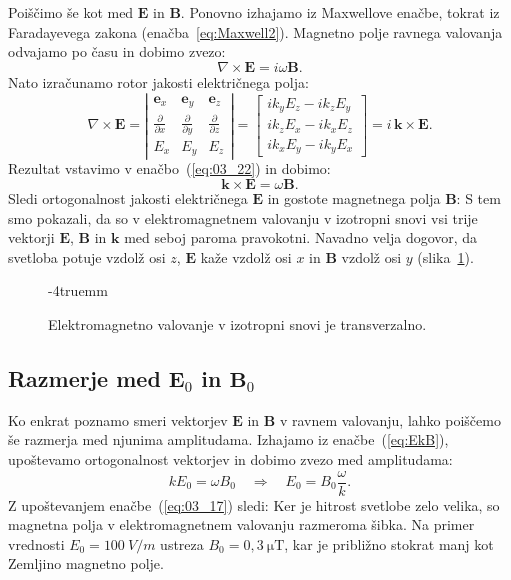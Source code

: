 Poiščimo še kot med $\mathbf{E}$ in $\mathbf{B}$. Ponovno izhajamo iz Maxwellove 
enačbe, tokrat iz Faradayevega zakona (enačba~\ref{eq:Maxwell2}). Magnetno polje ravnega valovanja 
odvajamo po času in dobimo zvezo:
\begin{equation}
\nabla\times\mathbf{E} = i \omega \mathbf{B}.
\label{eq:03_22}
\end{equation}
Nato izračunamo rotor jakosti električnega polja:
\begin{equation}
\nabla \times \mathbf{E} = 
\left|
\begin{array}{ccc}
\mathbf{e}_x & \mathbf{e}_y & \mathbf{e}_z\\
\frac{\partial}{\partial x} & \frac{\partial}{\partial y} & \frac{\partial}{\partial z}\\
E_{x} & E_{y} & E_{z}
\end{array}\right|
= 
\left[
\begin{array}{c}
ik_y E_z-ik_zE_y\\
ik_z E_x-ik_xE_z\\
ik_x E_y-ik_yE_x
\end{array}\right] = 
i\, \mathbf{k}\times \mathbf{E}.
\label{eq:03_23}
\end{equation}
Rezultat vstavimo v enačbo~(\ref{eq:03_22}) in dobimo:
\begin{equation}
\mathbf{k}\times \mathbf{E} = \omega \mathbf{B}.
\label{eq:EkB}
\end{equation}
Sledi ortogonalnost jakosti električnega $\mathbf{E}$ in gostote magnetnega
polja $\mathbf{B}$:
S tem smo pokazali, da so v elektromagnetnem valovanju v izotropni snovi
vsi trije vektorji $\mathbf{E}$, $\mathbf{B}$ in $\mathbf{k}$
med seboj paroma pravokotni. Navadno velja dogovor, da svetloba potuje
vzdolž osi $z$, $\mathbf{E}$ kaže vzdolž osi $x$ in $\mathbf{B}$ vzdolž osi $y$ (slika~\ref{fig:03_orto}).
\begin{figure}[ht]
\centering
\def\svgwidth{120truemm} 

\caption{Elektromagnetno valovanje v izotropni snovi je transverzalno.}
\label{fig:03_orto}
\vglue-4truemm
\end{figure}

\subsection*{Razmerje med $\mathbf{E}_0$ in $\mathbf{B}_0$}
Ko enkrat poznamo smeri vektorjev $\mathbf{E}$ in $\mathbf{B}$ v ravnem valovanju, lahko poiščemo 
še razmerja med njunima amplitudama. Izhajamo iz enačbe~(\ref{eq:EkB}), upoštevamo
ortogonalnost vektorjev in dobimo zvezo med amplitudama:
\begin{equation}
k E_0 = \omega B_0 \quad \Longrightarrow \quad E_0 = B_0 \frac{\omega}{k}.
\label{eq:03_24}
\end{equation}
Z upoštevanjem enačbe~(\ref{eq:03_17}) sledi:
Ker je hitrost svetlobe zelo velika, so magnetna polja v elektromagnetnem valovanju 
razmeroma šibka. Na primer vrednosti 
$E_0 = 100~\si{V/m}$ ustreza $B_0 = 0,3~\si{\micro \tesla}$, kar je približno 
stokrat manj kot Zemljino magnetno polje. 

